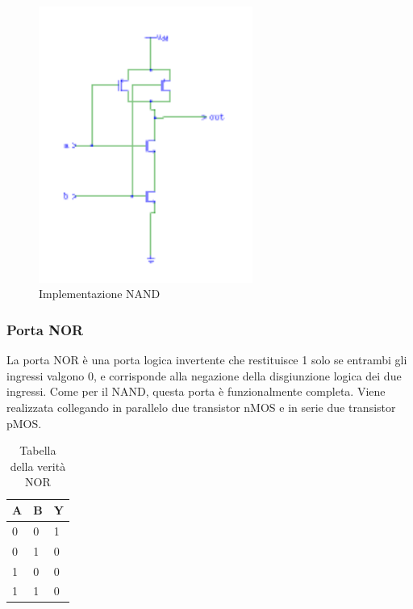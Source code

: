 \documentclass[10pt]{article}
\begin{document}
\begin{itemize}
\begin{figure}[ht]
\begin{minipage}[b]{0.4\textwidth}
    \includegraphics[width=70mm]{nand}
    \caption{Implementazione NAND}
    \label{ }
    \end{minipage}
    \end{figure}

\subsubsection{Porta NOR}
La porta NOR è una porta logica invertente che restituisce 1 solo se entrambi gli ingressi valgono 0, e corrisponde alla negazione della disgiunzione logica dei due ingressi. 
Come per il NAND, questa porta è funzionalmente completa. 
Viene realizzata collegando in parallelo due transistor nMOS e in serie due transistor pMOS.

\begin{table}[H]
    \begin{minipage}[b]{0.4\textwidth}
    \centering
    \begin{tabular}{|ll|l|}
    \hline
    \textbf{A} & \textbf{B} & \textbf{Y} \\ \hline
    0          & 0          & 1          \\ 
    0          & 1          & 0          \\ 
    1          & 0          & 0          \\ 
    1          & 1          & 0          \\ \hline
    \end{tabular}
        \caption{Tabella della verità NOR}
        \label{table:student}
    \end{minipage}
    \end{table}
    

\end{itemize}
\end{document}
